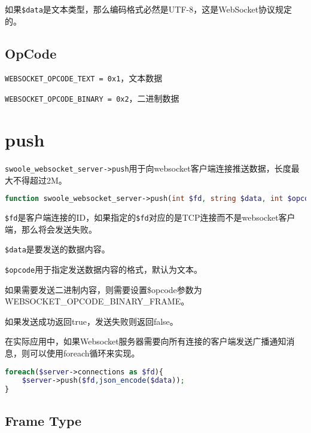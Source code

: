 如果\texttt{\$data}是文本类型，那么编码格式必然是UTF-8，这是WebSocket协议规定的。

\subsection{OpCode}


\begin{compactitem}
\item \texttt{WEBSOCKET\_OPCODE\_TEXT = 0x1}，文本数据
\item \texttt{WEBSOCKET\_OPCODE\_BINARY = 0x2}，二进制数据
\end{compactitem}

\section{push}

\texttt{swoole\_websocket\_server->push}用于向websocket客户端连接推送数据，长度最大不得超过2M。


\begin{lstlisting}[language=PHP]
function swoole_websocket_server->push(int $fd, string $data, int $opcode=1,bool $finish=true)
\end{lstlisting}

\begin{compactitem}
\item \texttt{\$fd}是客户端连接的ID，如果指定的\texttt{\$fd}对应的是TCP连接而不是websocket客户端，那么将会发送失败。
\item \texttt{\$data}是要发送的数据内容。

\item \texttt{\$opcode}用于指定发送数据内容的格式，默认为文本。

如果需要发送二进制内容，则需要设置\$opcode参数为WEBSOCKET\_OPCODE\_BINARY\_FRAME。

\item 如果发送成功返回true，发送失败则返回false。

\end{compactitem}


在实际应用中，如果Websocket服务器需要向所有连接的客户端发送广播通知消息，则可以使用foreach循环来实现。


\begin{lstlisting}[language=PHP]
foreach($server->connections as $fd){
	$server->push($fd,json_encode($data));
}
\end{lstlisting}


\subsection{Frame Type}



